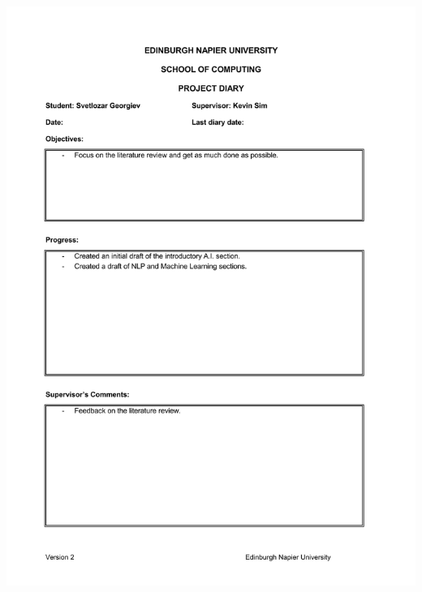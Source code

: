 \documentclass[12pt,a4paper]{article}
\begin{document}
\begin{appendices}
\includegraphics[width=\textwidth,height=\textheight,keepaspectratio]{week8.jpg}
\newpage

\end{appendices}
\end{document}
